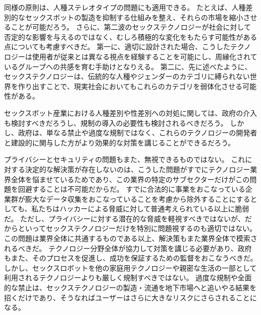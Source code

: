 \documentclass[paper=a4,book,openany]{jlreq}
\begin{document}
同様の原則は、人種ステレオタイプの問題にも適用できる。
たとえば、人種差別的なセックスボットの製造を抑制する仕組みを整え、それらの市場を縮小させることが可能だろう。
さらに、第二波のセックステクノロジーが社会に対して否定的な影響を与えるのではなく、むしろ積極的な変化をもたらす可能性がある点についても考慮すべきだ。
第一に、適切に設計された場合、こうしたテクノロジーは使用者が従来とは異なる視点を経験することを可能にし、周縁化されているグループへの共感を育む手助けとなりえる\citep{ramirez20:_can_techn_help_us_be_more_empat}。
第二に、先に述べたように、セックステクノロジーは、伝統的な人種やジェンダーのカテゴリに縛られない世界を作り出すことで、現実社会においてもこれらのカテゴリを弱体化させる可能性がある。

セックスボット産業における人種差別や性差別への対処に関しては、政府の介入も検討すべきだろうし、規制の導入の必要性も検討されるべきだろう。
しかし、政府は、単なる禁止や過度な規制ではなく、これらのテクノロジーの開発者と建設的に関与した方がより効果的な対策を講じることができるだろう。

プライバシーとセキュリティの問題もまた、無視できるものではない。
これに対する決定的な解決策が存在しないのは、こうした問題がすでにテクノロジー業界全体を悩ませているためであり、この業界の特定のサブセクターだけがこの問題を回避することは不可能だからだ。
すでに合法的に事業をおこなっている企業群が膨大なデータ収集をおこなっていることを考慮から除外することにするとしても、私たちはハッカーによる脅威に対して普通考えられている以上に脆弱だ。
ただし、プライバシーに対する潜在的な脅威を軽視すべきではないが、だからといってセックステクノロジーだけを特別に問題視するのも適切ではない。
この問題は業界全体に共通するものである以上、解決策もまた業界全体で模索されるべきだ。
テクノロジー分野全体が協力して対策を講じる必要があり、政府もまた、そのプロセスを促進し、成功を保証するための監督をおこなうべきだ。
しかし、セックスロボットを他の家庭用テクノロジーや親密な生活の一部として利用されるテクノロジーよりも厳しく規制すべきではない。
過度な規制や全面的な禁止は、セックステクノロジーの製造・流通を地下市場へと追いやる結果を招くだけであり、そうなればユーザーはさらに大きなリスクにさらされることになる。
\end{document}
